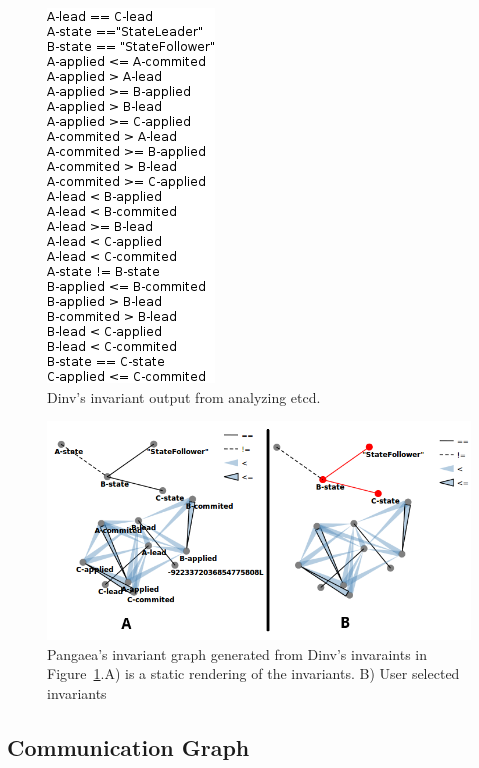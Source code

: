 \begin{figure}[h]
    \includegraphics[width=0.5\linewidth]{fig/dinv-output}%
    \caption{Dinv's invariant output from analyzing etcd.\label{fig:dinv-output}}%
\end{figure}

\begin{figure}[h]
    \includegraphics[width=\linewidth]{fig/invariant-graph}%
    \caption{Pangaea's invariant graph generated from Dinv's invaraints in Figure~\ref{fig:dinv-output}.A) is a static rendering of the invariants. B) User selected invariants \label{fig:invariant-graph}}%
\end{figure}

\subsection{Communication Graph}
\label{communication-graph}
